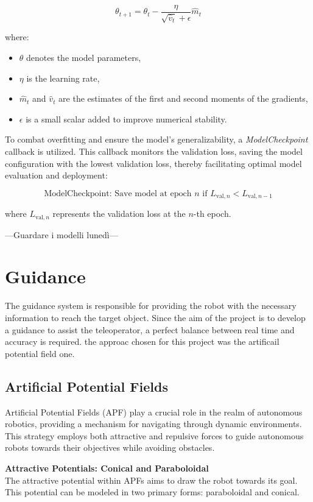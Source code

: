 \[
\theta_{t+1} = \theta_t - \frac{\eta}{\sqrt{\hat{v}_t} + \epsilon} \hat{m}_t
\]

where:
\begin{itemize}
    \item $\theta$ denotes the model parameters,
    \item $\eta$ is the learning rate,
    \item $\hat{m}_t$ and $\hat{v}_t$ are the estimates of the first and second moments of the gradients,
    \item $\epsilon$ is a small scalar added to improve numerical stability.
\end{itemize}

To combat overfitting and ensure the model's generalizability, a \textit{ModelCheckpoint} callback is utilized. 
This callback monitors the validation loss, saving the model configuration with the lowest validation loss, thereby facilitating optimal model evaluation and deployment:

\[
\text{ModelCheckpoint: Save model at epoch } n \text{ if } L_{\text{val},n} < L_{\text{val},n-1}
\]

where $L_{\text{val},n}$ represents the validation loss at the $n$-th epoch. 

---Guardare i modelli lunedì---




\section{Guidance}

The guidance system is responsible for providing the robot with the necessary information to reach the target object. 
Since the aim of the project is to develop a guidance to assist the teleoperator, a perfect balance between real time and accuracy is required.
the approac chosen for this project was the artificail potential field one.

\subsection{Artificial Potential Fields}
Artificial Potential Fields (APF) play a crucial role in the realm of autonomous robotics, providing a mechanism for navigating through dynamic environments. This strategy employs both attractive and repulsive forces to guide autonomous robots towards their objectives while avoiding obstacles.

\textbf{Attractive Potentials: Conical and Paraboloidal}\\
The attractive potential within APFs aims to draw the robot towards its goal. This potential can be modeled in two primary forms: paraboloidal and conical. 

